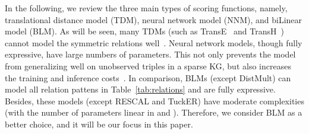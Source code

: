 \documentclass[10pt,journal,compsoc]{IEEEtran}
\begin{document}
In the following, we review the three main types of scoring functions, namely,
translational distance model (TDM),
neural network model (NNM), and
biLinear model (BLM).
As will be seen,
many TDMs (such as TransE~\cite{bordes2013translating} and TransH~\cite{wang2014knowledge}) cannot model the symmetric relations well~\cite{wang2017knowledge,ji2020survey}.
Neural network models,
though fully expressive,
have large numbers of parameters.
This not only prevents the model from generalizing well on unobserved triples in a sparse KG,
but also increases the training and inference costs~\cite{dettmers2017convolutional,lacroix2018canonical,vashishth2019composition}.
In comparison,
BLMs 
(except DistMult)
can model all relation pattens in Table~\ref{tab:relations} and are fully expressive.
Besides,
these models 
(except RESCAL and TuckER)
have moderate complexities
(with the number of parameters 
linear in  and ).
Therefore,
we consider BLM as a better choice, and it will be our focus in this paper.
\end{document}
